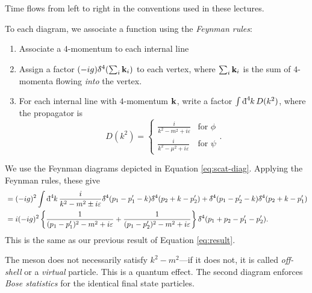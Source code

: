 \begin{leftbar}
  \begin{remark}
    Time flows from left to right in the conventions used in these lectures.
  \end{remark}
\end{leftbar}

To each diagram, we associate a function using the \emph{Feynman rules}:
\begin{enumerate}
  \item Associate a $4$-momentum to each internal line
  \item Assign a factor $(-ig) \bdelta^4(\sum_i \vb{k}_i)$ to each vertex, where $\sum_i \vb{k}_i$ is the sum of $4$-momenta flowing \emph{into} the vertex.
  \item For each internal line with $4$-momentum $\vb{k}$, write a factor $\int \bdd[4]{k} D(k^2)$, where the propagator is
    \begin{equation}
      D(k^2) = 
      \begin{cases}
	\frac{i}{k^2 - m^2 + i\varepsilon} & \text{for } \phi \\
	\frac{i}{k^2 - \mu^2 + i \varepsilon} & \text{for } \psi
      \end{cases}.
    \end{equation}
\end{enumerate}

\begin{example}
  We use the Feynman diagrams depicted in Equation \eqref{eq:scat-diag}. Applying the Feynman rules, these give
  \begin{align}
    &= (-ig)^2 \int \bdd[4]{k} \frac{i}{k^2 - m^2 \pm i\varepsilon}  \bdelta^4(p_1 - p_1' - k) \bdelta^4(p_2 + k - p_2')+ \bdelta^4(p_1 - p_2' - k) \bdelta^4(p_2 + k - p_1') \\
    &= i (-ig)^2 \left\{ \frac{1}{(p_1 - p_1')^2 - m^2 + i \varepsilon} + \frac{1}{(p_1 - p_2')^2 - m^2 + i \varepsilon} \right\} \bdelta^4(p_1 + p_2 - p_1' - p_2').
  \end{align}
  This is the same as our previous result of Equation \eqref{eq:result}.
\end{example}
\begin{leftbar}
  \begin{remark}
    The meson does not necessarily satisfy $k^2 - m^2$---if it does not, it is called \emph{off-shell} or a \emph{virtual} particle. This is a quantum effect.
    The second diagram enforces \emph{Bose statistics} for the identical final state particles.
  \end{remark}
\end{leftbar}

